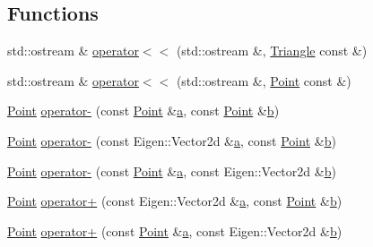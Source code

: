 \subsection*{Functions}
\begin{DoxyCompactItemize}
\item 
std\-::ostream \& \hyperlink{namespaceTspeed_1_1Geo_aa258344d03758569a10613ac9e9c6321}{operator$<$$<$} (std\-::ostream \&, \hyperlink{classTspeed_1_1Geo_1_1Triangle}{Triangle} const \&)
\item 
std\-::ostream \& \hyperlink{namespaceTspeed_1_1Geo_a53dbf4dff78a9df28c8c7d1650c6680e}{operator$<$$<$} (std\-::ostream \&, \hyperlink{classTspeed_1_1Geo_1_1Point}{Point} const \&)
\item 
\hyperlink{classTspeed_1_1Geo_1_1Point}{Point} \hyperlink{namespaceTspeed_1_1Geo_adf8407948a35f7e96d5d799fa15b3650}{operator-\/} (const \hyperlink{classTspeed_1_1Geo_1_1Point}{Point} \&\hyperlink{load__and__plot__lamb_8m_aa875ab3a8009406dcace7fa71a0f490d}{a}, const \hyperlink{classTspeed_1_1Geo_1_1Point}{Point} \&\hyperlink{load__and__plot__lamb_8m_a21c7e548e910bb7ce7dcea81de72c8f7}{b})
\item 
\hyperlink{classTspeed_1_1Geo_1_1Point}{Point} \hyperlink{namespaceTspeed_1_1Geo_a4ef6e700bdff1154b2721acce23cf6ad}{operator-\/} (const Eigen\-::\-Vector2d \&\hyperlink{load__and__plot__lamb_8m_aa875ab3a8009406dcace7fa71a0f490d}{a}, const \hyperlink{classTspeed_1_1Geo_1_1Point}{Point} \&\hyperlink{load__and__plot__lamb_8m_a21c7e548e910bb7ce7dcea81de72c8f7}{b})
\item 
\hyperlink{classTspeed_1_1Geo_1_1Point}{Point} \hyperlink{namespaceTspeed_1_1Geo_a0a9c1c3252be0ddaf17736746ec30c24}{operator-\/} (const \hyperlink{classTspeed_1_1Geo_1_1Point}{Point} \&\hyperlink{load__and__plot__lamb_8m_aa875ab3a8009406dcace7fa71a0f490d}{a}, const Eigen\-::\-Vector2d \&\hyperlink{load__and__plot__lamb_8m_a21c7e548e910bb7ce7dcea81de72c8f7}{b})
\item 
\hyperlink{classTspeed_1_1Geo_1_1Point}{Point} \hyperlink{namespaceTspeed_1_1Geo_af80150ec8874a02114d3c1761e668e8f}{operator+} (const Eigen\-::\-Vector2d \&\hyperlink{load__and__plot__lamb_8m_aa875ab3a8009406dcace7fa71a0f490d}{a}, const \hyperlink{classTspeed_1_1Geo_1_1Point}{Point} \&\hyperlink{load__and__plot__lamb_8m_a21c7e548e910bb7ce7dcea81de72c8f7}{b})
\item 
\hyperlink{classTspeed_1_1Geo_1_1Point}{Point} \hyperlink{namespaceTspeed_1_1Geo_a9ba1b73207379c959a394ef5e51d7f01}{operator+} (const \hyperlink{classTspeed_1_1Geo_1_1Point}{Point} \&\hyperlink{load__and__plot__lamb_8m_aa875ab3a8009406dcace7fa71a0f490d}{a}, const Eigen\-::\-Vector2d \&\hyperlink{load__and__plot__lamb_8m_a21c7e548e910bb7ce7dcea81de72c8f7}{b})

\end{DoxyCompactItemize}
